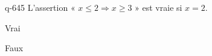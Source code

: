 \begin{truefalse}{q-645}
L'assertion « $x\leq 2 \Rightarrow x \geq 3$ » est vraie si $x=2$.
\item Vrai
\item* Faux
\end{truefalse}

